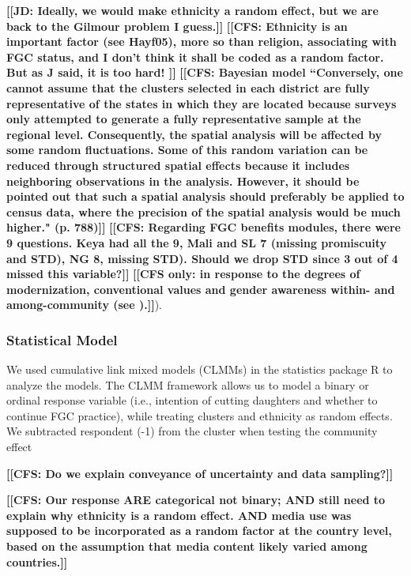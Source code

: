 \documentclass[12pt,]{article}
\newcommand{\comment}[1]{\textbf{[[#1]]}}
\newcommand{\cfcmt}[1]{\comment{CFS: #1}}
\newcommand{\cfonly}[1]{\comment{CFS only: #1}}
\newcommand{\jdcmt}[1]{\comment{JD: #1}}
\begin{document}
\jdcmt{Ideally, we would make ethnicity a random effect, but we are back to the Gilmour problem I guess.} \cfcmt{Ethnicity is an important factor (see Hayf05), more so than religion, associating with FGC status, and I don't think it shall be coded as a random factor.  But as J said, it is too hard! } %
\cfcmt{Bayesian model \cite{KandNwak09} ``Conversely, one cannot assume that the clusters selected in each district are fully representative of the states in which they are located because surveys only attempted to generate a fully representative sample at the regional level. Consequently, the spatial analysis will be affected by some random fluctuations.  Some of this random variation can be reduced through structured spatial effects because it includes neighboring observations in the analysis. However, it should be pointed out that such a spatial analysis should preferably be applied to census data, where the precision of the spatial analysis would be much higher." (p. 788)}
\cfcmt{Regarding FGC benefits modules, there were 9 questions.  Keya had all the 9, Mali and SL 7 (missing promiscuity and STD), NG 8, missing STD).  Should we drop STD since 3 out of 4 missed this variable?}
\cfonly {in response to the degrees of modernization, conventional values and gender awareness within- and among-community (see \cite{Achi14, BoylMcMo02, Hayf05, KandNwak09, ModrLiu13, Moor13, OdukAfol17, Youn02}).}).  

\subsubsection{Statistical Model}\label{statistical-model}

We used cumulative link mixed models (CLMMs) in the statistics package R \cite{Rstats,Rpackage_ordinal} to analyze the models.  The CLMM framework allows us to model a binary or ordinal response variable (i.e., intention of cutting daughters and whether to continue FGC practice), while treating clusters and ethnicity as random effects.  
We subtracted respondent (-1) from the cluster when testing the community effect 

\cfcmt{Do we explain conveyance of uncertainty and data sampling?}

\cfcmt{Our response ARE categorical not binary; AND still need to explain why ethnicity is a random effect. AND media use was supposed to be incorporated as a random factor at the country level, based on the assumption that media content likely varied among countries.}
\end{document}
